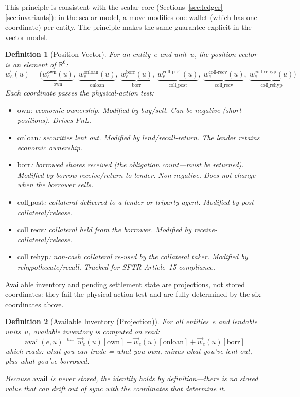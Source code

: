 \documentclass[11pt,a4paper]{article}
\newtheorem{definition}{Definition}[section]
\begin{document}
\noindent This principle is consistent with the scalar core (Sections~\ref{sec:ledger}--\ref{sec:invariants}): in the scalar model, a move modifies one wallet (which has one coordinate) per entity. The principle makes the same guarantee explicit in the vector model.

\begin{definition}[Position Vector]
\label{def:position-vector-gpm}
For an entity~$e$ and unit~$u$, the \emph{position vector} is an element of $\mathbb{R}^6$:
\[
\vec{w}_e(u) = \bigl(
  \underbrace{w^{\mathrm{own}}_e(u)}_{\text{own}},\;
  \underbrace{w^{\mathrm{onloan}}_e(u)}_{\text{onloan}},\;
  \underbrace{w^{\mathrm{borr}}_e(u)}_{\text{borr}},\;
  \underbrace{w^{\mathrm{coll\text{-}post}}_e(u)}_{\text{coll\_post}},\;
  \underbrace{w^{\mathrm{coll\text{-}recv}}_e(u)}_{\text{coll\_recv}},\;
  \underbrace{w^{\mathrm{coll\text{-}rehyp}}_e(u)}_{\text{coll\_rehyp}}
\bigr)
\]
Each coordinate passes the physical-action test:
\begin{itemize}[nosep]
\item $\mathrm{own}$: economic ownership. Modified by buy/sell. Can be negative (short positions). Drives PnL.
\item $\mathrm{onloan}$: securities lent out. Modified by lend/recall-return. The lender retains economic ownership.
\item $\mathrm{borr}$: borrowed shares received (the obligation count---must be returned). Modified by borrow-receive/return-to-lender. Non-negative. Does not change when the borrower sells.
\item $\mathrm{coll\_post}$: collateral delivered to a lender or triparty agent. Modified by post-collateral/release.
\item $\mathrm{coll\_recv}$: collateral held from the borrower. Modified by receive-collateral/release.
\item $\mathrm{coll\_rehyp}$: non-cash collateral re-used by the collateral taker. Modified by rehypothecate/recall. Tracked for SFTR Article~15 compliance.
\end{itemize}
\end{definition}

\noindent Available inventory and pending settlement state are projections, not stored coordinates: they fail the physical-action test and are fully determined by the six coordinates above.

\begin{definition}[Available Inventory (Projection)]
\label{def:avail-projection}
For all entities~$e$ and lendable units~$u$, available inventory is computed on read:
\[
\mathrm{avail}(e,u) \;\stackrel{\mathrm{def}}{=}\; \vec{w}_e(u)[\mathrm{own}] - \vec{w}_e(u)[\mathrm{onloan}] + \vec{w}_e(u)[\mathrm{borr}]
\]
which reads: \emph{what you can trade = what you own, minus what you've lent out, plus what you've borrowed.}

Because $\mathrm{avail}$ is never stored, the identity holds by definition---there is no stored value that can drift out of sync with the coordinates that determine it.
\end{definition}
\end{document}
